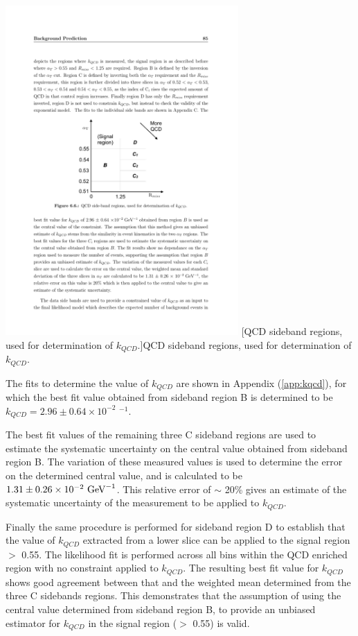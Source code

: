 \begin{minipage}{\linewidth}
\centering
\includegraphics[width = 3.5in]{plots/qcd_cartoon.pdf}
[QCD sideband regions, used for determination of $k_{QCD}$.]{QCD sideband regions, used for determination of $k_{QCD}$.}
\label{fig:qcdcartoon}
\end{minipage}

The fits to determine the value of $k_{QCD}$ are shown in Appendix (\ref{app:kqcd}), for which the best fit value obtained from sideband region B is determined to be $k_{QCD} = 2.96 \pm 0.64 \times 10^{-2}$ \GeV$^{-1}$. 

The best fit values of the remaining three C sideband regions are used to estimate the systematic uncertainty on the central value obtained from sideband region B. The variation of these measured values is used to determine the error on the determined central value, and is calculated to be $1.31 \pm 0.26 \times 10^{-2} \text{ GeV}^{-1}$. This relative error of $\sim$ 20\% gives an estimate of the systematic uncertainty of the measurement to be applied to $k_{QCD}$.

Finally the same procedure is performed for sideband region D to establish that the value of $k_{QCD}$ extracted from a lower \alphat slice can be applied to the signal region \alphat $>$ 0.55. The likelihood fit is performed across all \theht bins within the QCD enriched region with no constraint applied to $k_{QCD}$. The resulting best fit value for $k_{QCD}$ shows good agreement between that and the weighted mean determined from the three C sidebands regions. This demonstrates that the assumption of using the central value determined from sideband region B, to provide an unbiased estimator for $k_{QCD}$ in the signal region (\alphat $>$ 0.55) is valid.

